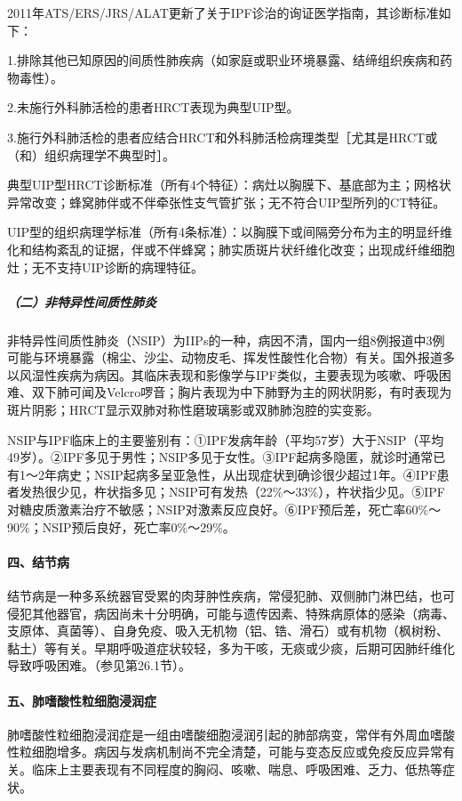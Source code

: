 2011年ATS/ERS/JRS/ALAT更新了关于IPF诊治的询证医学指南，其诊断标准如下：

1.排除其他已知原因的间质性肺疾病（如家庭或职业环境暴露、结缔组织疾病和药物毒性）。

2.未施行外科肺活检的患者HRCT表现为典型UIP型。

3.施行外科肺活检的患者应结合HRCT和外科肺活检病理类型［尤其是HRCT或（和）组织病理学不典型时］。

典型UIP型HRCT诊断标准（所有4个特征）：病灶以胸膜下、基底部为主；网格状异常改变；蜂窝肺伴或不伴牵张性支气管扩张；无不符合UIP型所列的CT特征。

UIP型的组织病理学标准（所有4条标准）：以胸膜下或间隔旁分布为主的明显纤维化和结构紊乱的证据，伴或不伴蜂窝；肺实质斑片状纤维化改变；出现成纤维细胞灶；无不支持UIP诊断的病理特征。

\subparagraph{（二）非特异性间质性肺炎}

非特异性间质性肺炎（NSIP）为IIPs的一种，病因不清，国内一组8例报道中3例可能与环境暴露（棉尘、沙尘、动物皮毛、挥发性酸性化合物）有关。国外报道多以风湿性疾病为病因。其临床表现和影像学与IPF类似，主要表现为咳嗽、呼吸困难、双下肺可闻及Velcro啰音；胸片表现为中下肺野为主的网状阴影，有时表现为斑片阴影；HRCT显示双肺对称性磨玻璃影或双肺肺泡腔的实变影。

NSIP与IPF临床上的主要鉴别有：①IPF发病年龄（平均57岁）大于NSIP（平均49岁）。②IPF多见于男性；NSIP多见于女性。③IPF起病多隐匿，就诊时通常已有1～2年病史；NSIP起病多呈亚急性，从出现症状到确诊很少超过1年。④IPF患者发热很少见，杵状指多见；NSIP可有发热（22\%～33\%），杵状指少见。⑤IPF对糖皮质激素治疗不敏感；NSIP对激素反应良好。⑥IPF预后差，死亡率60\%～90\%；NSIP预后良好，死亡率0\%～29\%。

\paragraph{四、结节病}

结节病是一种多系统器官受累的肉芽肿性疾病，常侵犯肺、双侧肺门淋巴结，也可侵犯其他器官，病因尚未十分明确，可能与遗传因素、特殊病原体的感染（病毒、支原体、真菌等）、自身免疫、吸入无机物（铝、锆、滑石）或有机物（枫树粉、黏土）等有关。早期呼吸道症状较轻，多为干咳，无痰或少痰，后期可因肺纤维化导致呼吸困难。（参见第26.1节）。

\paragraph{五、肺嗜酸性粒细胞浸润症}

肺嗜酸性粒细胞浸润症是一组由嗜酸细胞浸润引起的肺部病变，常伴有外周血嗜酸性粒细胞增多。病因与发病机制尚不完全清楚，可能与变态反应或免疫反应异常有关。临床上主要表现有不同程度的胸闷、咳嗽、喘息、呼吸困难、乏力、低热等症状。

